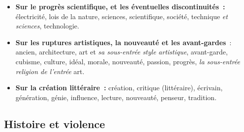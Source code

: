 \begin{itemize}\setlength{\itemsep}{6pt}

\item \textbf{Sur le progrès scientifique, et les éventuelles discontinuités~:} électricité, lois de la nature, sciences, scientifique, société, technique \textit{et sciences}, technologie.

\item \textbf{Sur les ruptures artistiques, la nouveauté et les avant-gardes}~: ancien, architecture, art et \textit{sa sous-entrée style artistique}, avant-garde, cubisme, culture, idéal, morale, nouveauté, passion, progrès, \textit{la sous-entrée \emph{religion} de l'entrée} art.

\item \textbf{Sur la création littéraire~:} création, critique (littéraire), écrivain, génération, génie, influence, lecture, nouveauté, penseur, tradition.

\end{itemize}


\subsection{Histoire et violence}

